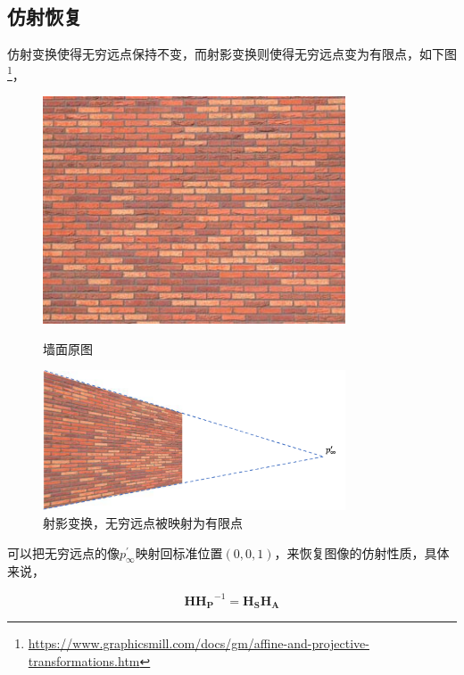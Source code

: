 	\subsection{仿射恢复}

		仿射变换使得无穷远点保持不变，而射影变换则使得无穷远点变为有限点，如下图\footnote{\url{https://www.graphicsmill.com/docs/gm/affine-and-projective-transformations.htm}}，

		\begin{figure}[H]
			\begin{minipage}[t]{0.52\linewidth}
				\centering
				\includegraphics[width=0.8\textwidth]{../images/origin_.jpeg}
				\caption{墙面原图}
			\end{minipage}
			\begin{minipage}[t]{0.78\linewidth}
				\centering
				\includegraphics[width=0.8\textwidth]{../images/projective_.png}
				\caption{射影变换，无穷远点被映射为有限点}
			\end{minipage}			
		\end{figure}

		可以把无穷远点的像$p^{\prime}_{\infty}$映射回标准位置$(0,0,1)$，来恢复图像的仿射性质，具体来说，

		$$
			\mathbf{H}\mathbf{H_P}^{-1} = \mathbf{H_S}\mathbf{H_A}
		$$


